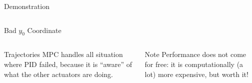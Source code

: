 \documentclass[xetex, smaller, aspectratio=43]{beamer}
\begin{document}
\begin{frame}{Demonstration}
\begin{columns}[T]
    \begin{column}{.33\linewidth}
      \begin{exampleblock}{Bad $y_0$ Coordinate}
      \end{exampleblock}
    \end{column}
  \end{columns}

  \begin{columns}[t]
    \begin{column}{.5\linewidth}
      \begin{block}{Trajectories}
        MPC handles all situation where PID failed, because it is ``aware'' of
        what the other actuators are doing.
      \end{block}
    \end{column}
    \begin{column}{.5\linewidth}
      \begin{alertblock}{Note}
        Performance does not come for free: it is computationally (a lot) more
        expensive, but worth it!
      \end{alertblock}
    \end{column}
  \end{columns}
\end{frame}
\end{document}
